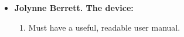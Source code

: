 \begin{itemize}
\begin{enumerate}
	\end{enumerate}
	
	
	
	\item {\textbf{Jolynne Berrett.  The device:}}
	\begin{enumerate}
		\item Must have a useful, readable user manual.\\[.5cm] 
%		
%
%		
%	
%
%

\end{enumerate}
\end{itemize}
